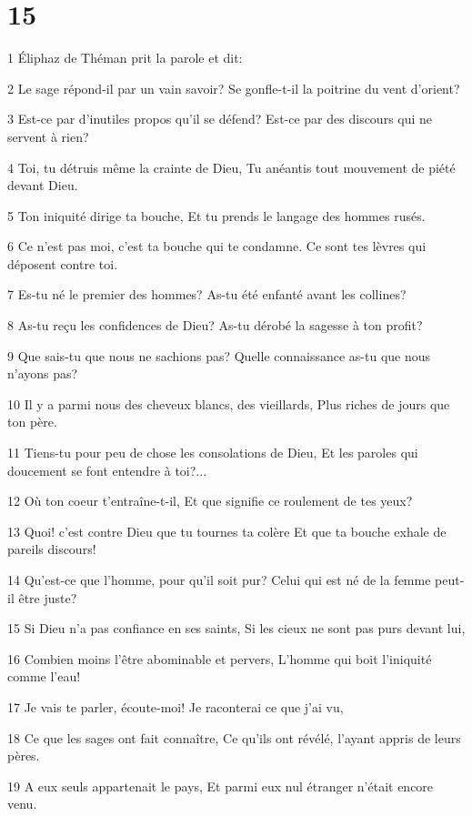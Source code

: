 \chapter{15}

\par 1 Éliphaz de Théman prit la parole et dit:
\par 2 Le sage répond-il par un vain savoir? Se gonfle-t-il la poitrine du vent d'orient?
\par 3 Est-ce par d'inutiles propos qu'il se défend? Est-ce par des discours qui ne servent à rien?
\par 4 Toi, tu détruis même la crainte de Dieu, Tu anéantis tout mouvement de piété devant Dieu.
\par 5 Ton iniquité dirige ta bouche, Et tu prends le langage des hommes rusés.
\par 6 Ce n'est pas moi, c'est ta bouche qui te condamne. Ce sont tes lèvres qui déposent contre toi.
\par 7 Es-tu né le premier des hommes? As-tu été enfanté avant les collines?
\par 8 As-tu reçu les confidences de Dieu? As-tu dérobé la sagesse à ton profit?
\par 9 Que sais-tu que nous ne sachions pas? Quelle connaissance as-tu que nous n'ayons pas?
\par 10 Il y a parmi nous des cheveux blancs, des vieillards, Plus riches de jours que ton père.
\par 11 Tiens-tu pour peu de chose les consolations de Dieu, Et les paroles qui doucement se font entendre à toi?...
\par 12 Où ton coeur t'entraîne-t-il, Et que signifie ce roulement de tes yeux?
\par 13 Quoi! c'est contre Dieu que tu tournes ta colère Et que ta bouche exhale de pareils discours!
\par 14 Qu'est-ce que l'homme, pour qu'il soit pur? Celui qui est né de la femme peut-il être juste?
\par 15 Si Dieu n'a pas confiance en ses saints, Si les cieux ne sont pas purs devant lui,
\par 16 Combien moins l'être abominable et pervers, L'homme qui boit l'iniquité comme l'eau!
\par 17 Je vais te parler, écoute-moi! Je raconterai ce que j'ai vu,
\par 18 Ce que les sages ont fait connaître, Ce qu'ils ont révélé, l'ayant appris de leurs pères.
\par 19 A eux seuls appartenait le pays, Et parmi eux nul étranger n'était encore venu.
